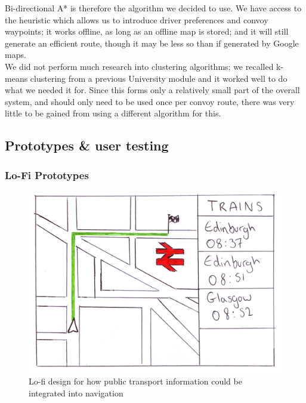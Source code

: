 \documentclass{article}
\begin{document}
Bi-directional A* is therefore the algorithm we decided to use. We have access to the heuristic which allows us to introduce driver preferences and convoy waypoints; it works offline, as long as an offline map is stored; and it will still generate an efficient route, though it may be less so than if generated by Google maps.\\

We did not perform much research into clustering algorithms; we recalled k-means clustering from a previous University module and it worked well to do what we needed it for. Since this forms only a relatively small part of the overall system, and should only need to be used once per convoy route, there was very little to be gained from using a different algorithm for this.

%
%

\subsection{Prototypes \& user testing}\label{ssec:nav-prototypes-testing}

\subsubsection{Lo-Fi Prototypes}
\begin{figure}[H]
	\centering
    \includegraphics[scale=0.5]{train-widget}
    \caption{Lo-fi design for how public transport information could be integrated into navigation}\label{train-widget}
\end{figure}
\end{document}
